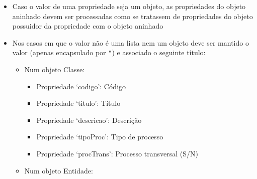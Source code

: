 \begin{itemize}
\begin{itemize}
\begin{itemize}
\begin{itemize}
            \end{itemize}
        \end{itemize}
        \item Na propriedade `df' de um objeto Classe:
        \begin{itemize}
            \item Propriedade `justificacao', gera duas colunas no \acrshort{csv}:
            \begin{itemize}
                \item Título: Critério DF \\
                      Valor: Concatenação por \verb|#\n| da propriedade `tipoId' de cada elemento da lista
                \item Título: ProcRefs/LegRefs DF \\
                      Valor: Cada elemento da lista é mapeado para a concatenação por \verb|#\n| da lista presente na propriedade `processos' ou na propriedade `legs' sendo a concatenação encapsulada por parênteses curvos; Concatenação por \verb|#\n| do mapeamento de cada elemento da lista               
            \end{itemize}
        \end{itemize}
    \end{itemize}
    \item Caso o valor de uma propriedade seja um objeto, as propriedades do objeto aninhado devem ser processadas como se tratassem de propriedades do objeto possuidor da propriedade com o objeto aninhado
    \item Nos casos em que o valor não é uma lista nem um objeto deve ser mantido o valor (apenas encapsulado por \verb|"|) e associado o seguinte título:
    \begin{itemize}
        \item Num objeto Classe:
        \begin{itemize}
            \item Propriedade `codigo': Código
            \item Propriedade `titulo': Título
            \item Propriedade `descricao': Descrição
            \item Propriedade `tipoProc': Tipo de processo
            \item Propriedade `procTrans': Processo transversal (S/N)
        \end{itemize}
        \item Num objeto Entidade:
        \begin{itemize}

\end{itemize}
\end{itemize}
\end{itemize}
